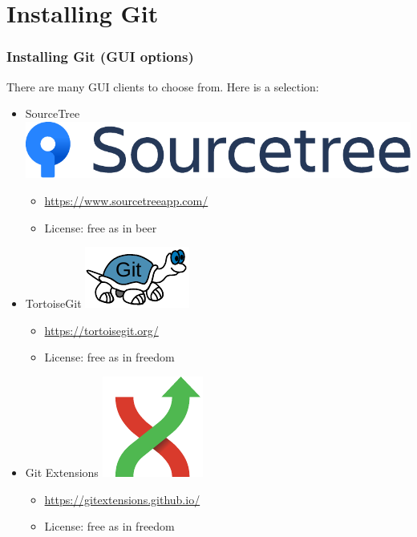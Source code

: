 \section{Installing Git}

\begin{frame}
\frametitle{Installing Git (GUI options)}
There are many GUI clients to choose from.  Here is a selection:
\begin{itemize}
    \item SourceTree
        \includegraphics[height=0.05\textheight]{images/Sourcetree-blue.pdf}
        \begin{itemize}
            \item \url{https://www.sourcetreeapp.com/}
            \item License: free as in beer
        \end{itemize}
    \item TortoiseGit
        \includegraphics[height=0.05\textheight]{images/tgit_logo.pdf}
        \begin{itemize}
            \item \url{https://tortoisegit.org/}
            \item License: free as in freedom
        \end{itemize}
    \item Git Extensions
        \includegraphics[height=0.05\textheight]{images/git-extensions-logo.pdf}
        \begin{itemize}
            \item \url{https://gitextensions.github.io/}
            \item License: free as in freedom
        \end{itemize}

\end{itemize}
\end{frame}
